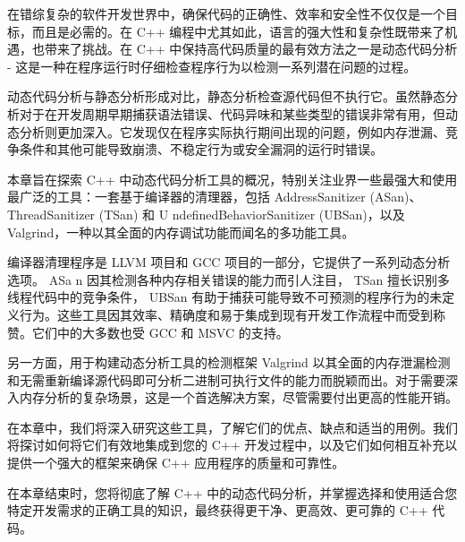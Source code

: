 在错综复杂的软件开发世界中，确保代码的正确性、效率和安全性不仅仅是一个目标，而且是必需的。在 C++ 编程中尤其如此，语言的强大性和复杂性既带来了机遇，也带来了挑战。在 C++ 中保持高代码质量的最有效方法之一是动态代码分析 - 这是一种在程序运行时仔细检查程序行为以检测一系列潜在问题的过程。

动态代码分析与静态分析形成对比，静态分析检查源代码但不执行它。虽然静态分析对于在开发周期早期捕获语法错误、代码异味和某些类型的错误非常有用，但动态分析则更加深入。它发现仅在程序实际执行期间出现的问题，例如内存泄漏、竞争条件和其他可能导致崩溃、不稳定行为或安全漏洞的运行时错误。

本章旨在探索 C++ 中动态代码分析工具的概况，特别关注业界一些最强大和使用最广泛的工具：一套基于编译器的清理器，包括 AddressSanitizer (ASan)、 ThreadSanitizer (TSan) 和 U ndefinedBehaviorSanitizer (UBSan)，以及 Valgrind，一种以其全面的内存调试功能而闻名的多功能工具。

编译器清理程序是 LLVM 项目和 GCC 项目的一部分，它提供了一系列动态分析选项。 ASa n 因其检测各种内存相关错误的能力而引人注目， TSan 擅长识别多线程代码中的竞争条件， UBSan 有助于捕获可能导致不可预测的程序行为的未定义行为。这些工具因其效率、精确度和易于集成到现有开发工作流程中而受到称赞。它们中的大多数也受 GCC 和 MSVC 的支持。

另一方面，用于构建动态分析工具的检测框架 Valgrind 以其全面的内存泄漏检测和无需重新编译源代码即可分析二进制可执行文件的能力而脱颖而出。对于需要深入内存分析的复杂场景，这是一个首选解决方案，尽管需要付出更高的性能开销。

在本章中，我们将深入研究这些工具，了解它们的优点、缺点和适当的用例。我们将探讨如何将它们有效地集成到您的 C++ 开发过程中，以及它们如何相互补充以提供一个强大的框架来确保 C++ 应用程序的质量和可靠性。

在本章结束时，您将彻底了解 C++ 中的动态代码分析，并掌握选择和使用适合您特定开发需求的正确工具的知识，最终获得更干净、更高效、更可靠的 C++ 代码。
